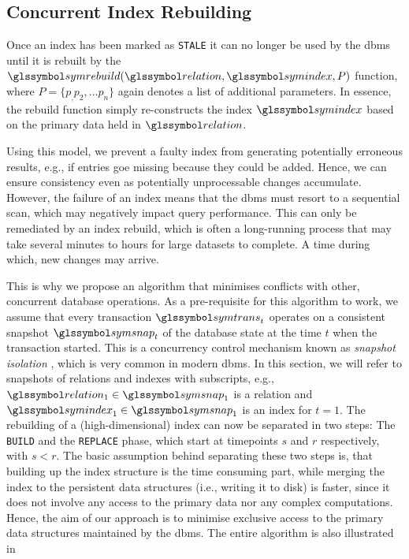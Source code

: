 \subsection{Concurrent Index Rebuilding}

Once an index has been marked as \texttt{STALE} it can no longer be used by the \acrshort{dbms} until it is rebuilt by the $\symrebuild(\relation,\symindex,P)$ function, where $P = \{ p_, p_2, \ldots p_n \}$ again denotes a list of additional parameters. In essence, the rebuild function simply re-constructs the index $\symindex$ based on the primary data held in $\relation$.

Using this model, we prevent a faulty index from generating potentially erroneous results, e.g., if entries goe missing because they could be added. Hence, we can ensure consistency even as potentially unprocessable changes accumulate. However, the failure of an index means that the \acrshort{dbms} must resort to a sequential scan, which may negatively impact query performance. This can only be remediated by an index rebuild, which is often a long-running process that may take several minutes to hours for large datasets to complete. A time during which, new changes may arrive.

This is why we propose an algorithm that minimises conflicts with other, concurrent database operations. As a pre-requisite for this algorithm to work, we assume that every transaction $\symtrans_t$ operates on a consistent snapshot $\symsnap_t$ of the database state at the time $t$ when the transaction started. This is a concurrency control mechanism known as \emph{snapshot isolation} \cite{Berenson:1995Critique}, which is very common in modern \acrshort{dbms}. In this section, we will refer to snapshots of relations and indexes with subscripts, e.g.,  $\relation_{1} \in \symsnap_1$ is a relation and $\symindex_{1} \in \symsnap_1$ is an index for $t=1$. The rebuilding of a (high-dimensional) index can now be separated in two steps: The \texttt{BUILD} and the \texttt{REPLACE} phase, which start at timepoints $s$ and $r$ respectively, with $s < r$. The basic assumption behind separating these two steps is, that building up the index structure is the time consuming part, while merging the index to the persistent data structures (i.e., writing it to disk) is faster, since it does not involve any access to the primary data nor any complex computations. Hence, the aim of our approach is to minimise exclusive access to the primary data structures maintained by the \acrshort{dbms}. The entire algorithm is also illustrated in 

